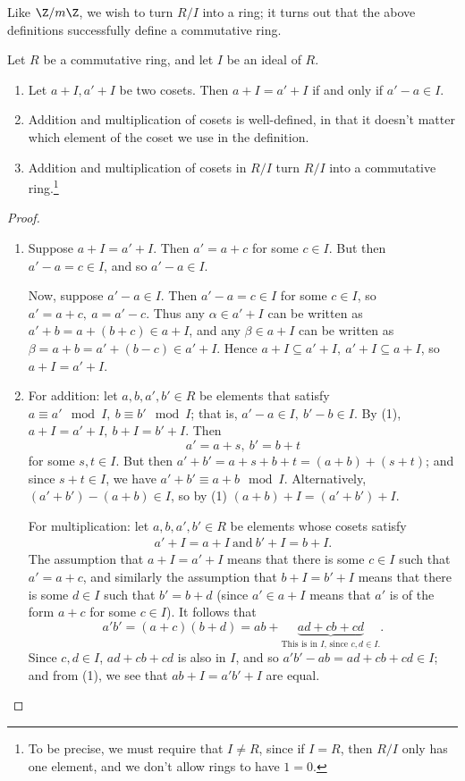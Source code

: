 \documentclass[math1530-lecture-notes]{subfiles}
\begin{document}
Like $\Z / m\Z$, we wish to turn $R / I$ into a ring; it turns out that the above definitions
successfully define a commutative ring.

\begin{proposition}[]{}
  Let $R$ be a commutative ring, and let $I$ be an ideal of $R$.
  \begin{enumerate}
    \item Let $a+I,a'+I$ be two cosets. Then $a+I=a'+I$ if and only if $a'-a\in I$.
    \item Addition and multiplication of cosets is well-defined, in that it doesn't matter which
      element of the coset we use in the definition.
    \item Addition and multiplication of cosets in $R / I$ turn $R / I$ into a commutative
      ring.\footnote{To be precise, we must require that $I\neq R$, since if $I=R$, then $R/I$ only
      has one element, and we don't allow rings to have $1=0$.}
  \end{enumerate}
\end{proposition}
\begin{proof}[Proof]
  \begin{enumerate}
    \item Suppose $a+I=a'+I$. Then $a'=a+c$ for some $c\in I$. But then $a'-a=c\in I$, and so
      $a'-a\in I$.

      Now, suppose $a'-a\in I$. Then $a'-a=c\in I$ for some $c\in I$, so $a'=a+c,\ a=a'-c$. Thus any
      $\alpha\in a'+I$ can be written as $a'+b=a+(b+c)\in a+I$, and any $\beta\in a+I$ can be
      written as $\beta=a+b=a'+(b-c)\in a'+I$. Hence $a+I\subseteq a'+I,\ a'+I\subseteq a+I$, so
      $a+I=a'+I$.

    \item For addition: let $a,b,a',b'\in R$ be elements that satisfy $a\equiv a'\mod{I},\ b\equiv
      b'\mod{I}$; that is, $a'-a\in I,\ b'-b\in I$. By (1), $a+I=a'+I,\ b+I=b'+I$. Then \[
        a'=a+s,\ b'=b+t
      \] for some $s,t\in I$. But then $a'+b'=a+s+b+t=(a+b)+(s+t)$; and since $s+t\in I$, we have
      $a'+b'\equiv a+b\mod{I}$. Alternatively, $(a'+b')-(a+b)\in I$, so by (1) $(a+b)+I=(a'+b')+I$.

      For multiplication: let $a,b,a',b'\in R$ be elements whose cosets satisfy
      \begin{align*}
        a'+I=a+I ~\text{and}~b'+I=b+I
      .\end{align*} The assumption that $a+I=a'+I$ means that there is some $c\in I$ such that $a'=a+c$,
      and similarly the assumption that $b+I=b'+I$ means that there is some $d\in I$ such that $b'=b+d$
      (since $a'\in a+I$ means that $a'$ is of the form $a+c$ for some $c\in I$). It follows that \[
        a'b'=(a+c)(b+d)=ab+\underbrace{ad+cb+cd}_\text{This is in $I$, since $c,d\in I$.}
      .\] Since $c,d\in I$, $ad+cb+cd$ is also in $I$, and so $a'b'-ab=ad+cb+cd \in I$; and from (1), we
      see that $ab+I=a'b'+I$ are equal.
  \end{enumerate}
\end{proof}
\end{document}
